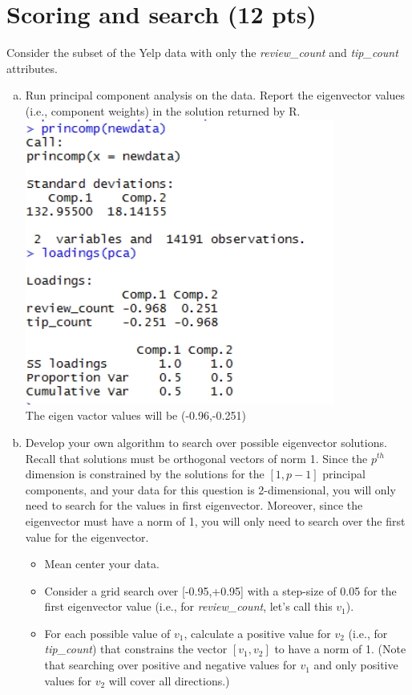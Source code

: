 \documentclass[11pt]{article}
\begin{document}
\section{Scoring and search (12 pts)}
Consider the subset of the Yelp data with only the {\em review\_count} and {\em tip\_count} attributes.
\begin{enumerate}[(a)]
\item Run principal component analysis on the data. Report the eigenvector values (i.e., component weights) in the solution returned by R. \\
\includegraphics[width=4in]{score.png}\\
The eigen vactor values will be (-0.96,-0.251)
\item Develop your own algorithm to search over possible eigenvector solutions. \\
Recall that solutions must be orthogonal vectors of norm 1. Since the $p^{th}$ dimension is constrained by the solutions for the $[1,p-1]$ principal components, and your data for this question is 2-dimensional, you will only need to search for the values in first eigenvector. Moreover, since the eigenvector must have a norm of 1, you will only need to search over the first value for the eigenvector. 
\begin{itemize}
\item Mean center your data.
\item Consider a grid search over [-0.95,+0.95] with a step-size of 0.05 for the first eigenvector value (i.e., for {\em review\_count}, let's call this $v_1$). 
\item For each possible value of $v_1$, calculate a positive value for $v_2$ (i.e., for {\em tip\_count}) that constrains the vector $[v_1, v_2]$ to have a norm of 1. (Note that searching over positive and negative values for $v_1$ and only positive values for $v_2$ will cover all directions.)

\end{itemize}
\end{enumerate}
\end{document}
